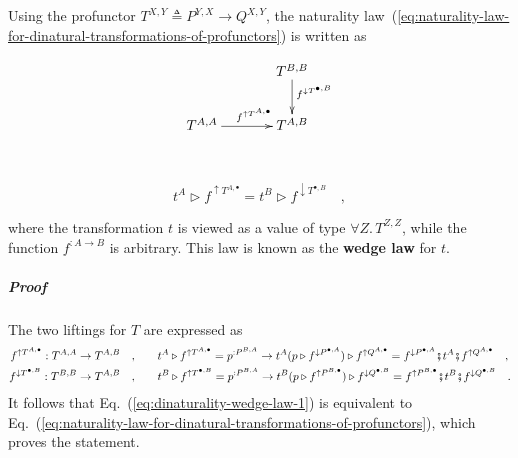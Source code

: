 Using the profunctor $T^{X,Y}\triangleq P^{Y,X}\rightarrow Q^{X,Y}$,
the naturality law~(\ref{eq:naturality-law-for-dinatural-transformations-of-profunctors})
is written as

\begin{wrapfigure}[9]{l}{0.24\columnwidth}%
\vspace{-1.5\baselineskip}
\[
\xymatrix{\xyScaleY{2.0pc}\xyScaleX{3.0pc} & T^{B,B}\ar[d]\sp(0.37){f^{\downarrow T^{\bullet,B}}}\\
T^{A,A}\ar[r]\sp(0.5){~~~f^{\uparrow T^{A,\bullet}}} & T^{A,B}
}
\]

\vspace{-0\baselineskip}
\end{wrapfigure}%

~\vspace{-0.8\baselineskip}

\begin{equation}
t^{A}\triangleright f^{\uparrow T^{A,\bullet}}=t^{B}\triangleright f^{\downarrow T^{\bullet,B}}\quad,\label{eq:dinaturality-wedge-law-1}
\end{equation}
\vspace{-0.8\baselineskip}

\noindent where the transformation $t$ is viewed as a value of type
$\forall Z.\,T^{Z,Z}$, while the function $f^{:A\rightarrow B}$
is arbitrary. This law is known as the \textbf{wedge law}
for $t$.

\subparagraph{Proof}

The two liftings for $T$ are expressed as
\begin{align*}
f^{\uparrow T^{A,\bullet}}:T^{A,A}\rightarrow T^{A,B}\quad, & \quad\quad t^{A}\triangleright f^{\uparrow T^{A,\bullet}}=p^{:P^{B,A}}\rightarrow t^{A}(p\triangleright f^{\downarrow P^{\bullet,A}})\triangleright f^{\uparrow Q^{A,\bullet}}=f^{\downarrow P^{\bullet,A}}\bef t^{A}\bef f^{\uparrow Q^{A,\bullet}}\quad,\\
f^{\downarrow T^{\bullet,B}}:T^{B,B}\rightarrow T^{A,B}\quad, & \quad\quad t^{B}\triangleright f^{\uparrow T^{\bullet,B}}=p^{:P^{B,A}}\rightarrow t^{B}(p\triangleright f^{\uparrow P^{B,\bullet}})\triangleright f^{\downarrow Q^{\bullet,B}}=f^{\uparrow P^{B,\bullet}}\bef t^{B}\bef f^{\downarrow Q^{\bullet,B}}\quad.
\end{align*}
It follows that Eq.~(\ref{eq:dinaturality-wedge-law-1}) is equivalent
to Eq.~(\ref{eq:naturality-law-for-dinatural-transformations-of-profunctors}),
which proves the statement.

